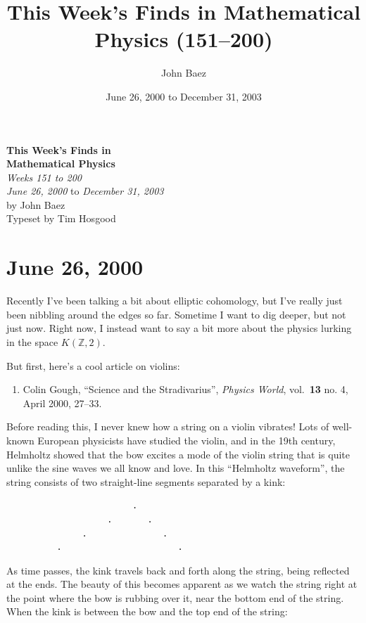 \documentclass{article}
\title{This Week's Finds in Mathematical Physics (151--200)}
\author{John Baez}
\date{June 26, 2000 to December 31, 2003}
\def\tightlist{}
\begin{document}
\begin{titlepage}
  \begin{center}
    {\Huge\textbf{This Week's Finds in}}
  \\[0.7em]{\Huge\textbf{Mathematical Physics}}
  \\[1em]{\huge\textit{Weeks 151 to 200}}
  \\[4em]{\LARGE \textit{June 26, 2000} to \textit{December 31, 2003}}
  \\[4em]{\huge by John Baez}
  \\[0.5em]{\Large{Typeset by Tim Hosgood}}
  \end{center}
\end{titlepage}

\tableofcontents

\hypertarget{week151}{%
\section{June 26, 2000}\label{week151}}

Recently I've been talking a bit about elliptic cohomology, but I've
really just been nibbling around the edges so far. Sometime I want to
dig deeper, but not just now. Right now, I instead want to say a bit
more about the physics lurking in the space \(K(\mathbb{Z},2)\).

But first, here's a cool article on violins:

\begin{enumerate}
\def\labelenumi{\arabic{enumi})}
\tightlist
\item
  Colin Gough, ``Science and the Stradivarius'', \emph{Physics World},
  vol.~\textbf{13} no. 4, April 2000, 27--33.
\end{enumerate}

Before reading this, I never knew how a string on a violin vibrates!
Lots of well-known European physicists have studied the violin, and in
the 19th century, Helmholtz showed that the bow excites a mode of the
violin string that is quite unlike the sine waves we all know and love.
In this ``Helmholtz waveform'', the string consists of two straight-line
segments separated by a kink:

\begin{verbatim}
                         .   
                    .       .
               .               .
          .                       .
\end{verbatim}

As time passes, the kink travels back and forth along the string, being
reflected at the ends. The beauty of this becomes apparent as we watch
the string right at the point where the bow is rubbing over it, near the
bottom end of the string. When the kink is between the bow and the top
end of the string:
\end{document}
